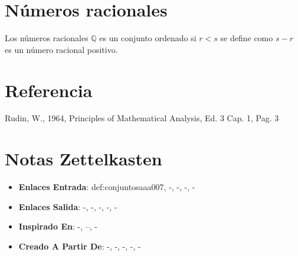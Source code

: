 \documentclass[12pt]{article}
\begin{document}
\section*{Números racionales}

\begin{example}
Los números racionales $\mathbb{Q}$ es un conjunto ordenado si $r < s$ se define como $s - r$ es un número racional positivo.
\end{example}

\section*{Referencia}
Rudin, W., 1964, Principles of Mathematical Analysis, Ed. 3 Cap. 1, Pag. 3 

\section*{Notas Zettelkasten}
\begin{itemize}
  \item \textbf{Enlaces Entrada}: def:conjuntosaaa007, -, -, -, -
  \item \textbf{Enlaces Salida}: -, -, -, -, -
  \item \textbf{Inspirado En}: -, --, -
  \item \textbf{Creado A Partir De}: -, -, -, -, -
\end{itemize}
\end{document}
